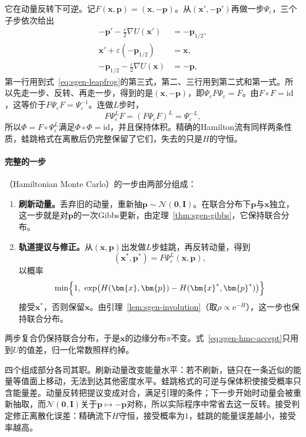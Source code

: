 它在动量反转下可逆。记$F(\bm{x},\bm{p})=(\bm{x},-\bm{p})$。从$(\bm{x}',-\bm{p}')$再做一步$\Psi_{\varepsilon}$，三个子步依次给出
\[
  \begin{aligned}
    -\bm{p}'-\tfrac{\varepsilon}{2}\nabla U(\bm{x}')&=-\bm{p}_{1/2},\\
    \bm{x}'+\varepsilon(-\bm{p}_{1/2})&=\bm{x},\\
    -\bm{p}_{1/2}-\tfrac{\varepsilon}{2}\nabla U(\bm{x})&=-\bm{p},
  \end{aligned}
\]
第一行用到式~\eqref{eq:sgen-leapfrog}的第三式，第二、三行用到第二式和第一式。所以先走一步、反转、再走一步，得到的是$(\bm{x},-\bm{p})$，即$\Psi_{\varepsilon}F\Psi_{\varepsilon}=F$。由$F\circ F=\mathrm{id}$，这等价于$F\Psi_{\varepsilon}F=\Psi_{\varepsilon}^{-1}$。连做$L$步时，
\[
  F\Psi_{\varepsilon}^{L}F=(F\Psi_{\varepsilon}F)^{L}=\Psi_{\varepsilon}^{-L},
\]
所以$\Phi=F\circ\Psi_{\varepsilon}^{L}$满足$\Phi\circ\Phi=\mathrm{id}$，并且保持体积。精确的Hamilton流有同样两条性质，蛙跳格式在离散后仍完整保留了它们，失去的只是$H$的守恒。

\paragraph{完整的一步}
（Hamiltonian Monte Carlo）的一步由两部分组成：
\begin{enumerate}
  \item \textbf{刷新动量。}丢弃旧的动量，重新抽$\bm{p}\sim\mathcal{N}(\bm{0},\bm{I})$。在联合分布下$\bm{p}$与$\bm{x}$独立，这一步就是对$\bm{p}$的一次Gibbs更新，由定理~\ref{thm:sgen-gibbs}，它保持联合分布。

  \item \textbf{轨道提议与修正。}从$(\bm{x},\bm{p})$出发做$L$步蛙跳，再反转动量，得到
  \[
    (\bm{x}^{*},\bm{p}^{*})=F\Psi_{\varepsilon}^{L}(\bm{x},\bm{p}),
  \]
  以概率
  \begin{equation}
    \min\Bigl\{1,\ \exp\bigl(H(\bm{x},\bm{p})-H(\bm{x}^{*},\bm{p}^{*})\bigr)\Bigr\}
    \label{eq:sgen-hmc-accept}
  \end{equation}
  接受$\bm{x}^{*}$，否则保留$\bm{x}$。由引理~\ref{lem:sgen-involution}（取$\rho\propto\mathrm{e}^{-H}$），这一步也保持联合分布。
\end{enumerate}
两步复合仍保持联合分布，于是$\bm{x}$的边缘分布$\pi$不变。式~\eqref{eq:sgen-hmc-accept}只用到$U$的值差，归一化常数照样约掉。

四个组成部分各司其职。刷新动量改变能量水平：若不刷新，链只在一条近似的能量等值面上移动，无法到达其他密度水平。蛙跳格式的可逆与保体积使接受概率只含能量差。动量反转把提议变成对合，满足引理的条件；下一步开始时动量会被重新抽取，而$\mathcal{N}(\bm{0},\bm{I})$关于$\bm{p}\mapsto-\bm{p}$对称，所以实际程序中常省去这一反转。接受判定修正离散化误差：精确流下$H$守恒，接受概率为$1$，蛙跳的能量误差越小，接受率越高。

